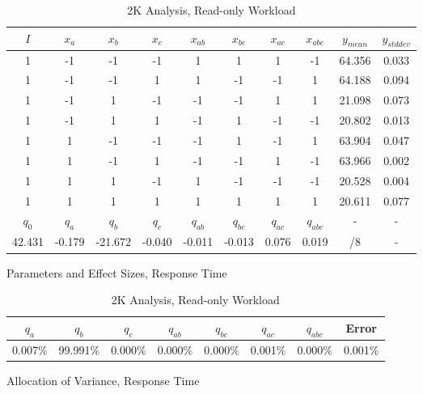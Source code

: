 \documentclass[11pt,a4paper]{article}
\begin{document}
\begin{table}
    \begin{subtable}{1.0\linewidth}\centering
        {\begin{tabular}{|cccccccc|cc|}
            \hline
            $I$ & $x_a$ & $x_b$ & $x_c$ & $x_{ab}$ & $x_{bc}$ & $x_{ac}$ & $x_{abc}$ & $y_{mean}$ & $y_{stddev}$\\
            \hline
                  1 &     -1 &      -1 &     -1 &      1 &      1 &     1 &    -1 & 64.356 &   0.033 \\
                  1 &     -1 &      -1 &      1 &      1 &     -1 &    -1 &     1 & 64.188 &   0.094 \\
                  1 &     -1 &       1 &     -1 &     -1 &     -1 &     1 &     1 & 21.098 &   0.073 \\
                  1 &     -1 &       1 &      1 &     -1 &      1 &    -1 &    -1 & 20.802 &   0.013 \\
                  1 &      1 &      -1 &     -1 &     -1 &      1 &    -1 &     1 & 63.904 &   0.047 \\
                  1 &      1 &      -1 &      1 &     -1 &     -1 &     1 &    -1 & 63.966 &   0.002 \\
                  1 &      1 &       1 &     -1 &      1 &     -1 &    -1 &    -1 & 20.528 &   0.004 \\
                  1 &      1 &       1 &      1 &      1 &      1 &     1 &     1 & 20.611 &   0.077 \\
            \hline
            $q_0$ & $q_a$ & $q_b$ & $q_c$ & $q_{ab}$ & $q_{bc}$ & $q_{ac}$ & $q_{abc}$ & - & -\\
             42.431 & -0.179 & -21.672 & -0.040 & -0.011 & -0.013 & 0.076 & 0.019 &      /8 &       - \\
            \hline
        \end{tabular}
        \caption{Parameters and Effect Sizes, Response Time}}
    \end{subtable}
    \begin{subtable}{1.0\linewidth}\centering
       {\begin{tabular}{|cccccccc|}
            \hline
            $q_a$ & $q_b$ & $q_c$ & $q_{ab}$ & $q_{bc}$ & $q_{ac}$ & $q_{abc}$ & Error \\
            \hline
              0.007\% &  99.991\% &  0.000\% &  0.000\% &  0.000\% & 0.001\% & 0.000\% &  0.001\% \\
            \hline
        \end{tabular}
        \caption{Allocation of Variance, Response Time}}
    \end{subtable}

    \caption{2K Analysis, Read-only Workload}
    \label{2k:read-only}
\end{table}
\end{document}
